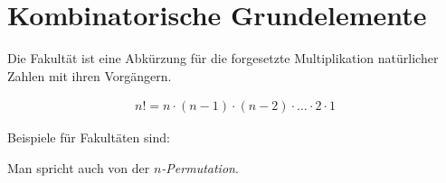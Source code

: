 \section{Kombinatorische Grundelemente}

\begin{defi}[Fakultät]
 Die Fakultät ist eine Abkürzung für die forgesetzte Multiplikation natürlicher Zahlen mit ihren Vorgängern.
 \begin{whitebox}
 \begin{align*}
  n! = n\cdot (n-1) \cdot (n-2) \cdot \ldots \cdot 2 \cdot 1
 \end{align*}
 \end{whitebox}
 
 Beispiele für Fakultäten sind:
 
\end{defi}

\begin{regel}[Anordnungsmöglichkeiten]
 Man spricht auch von der \emph{\(n\)-Permutation}.
\end{regel}

\begin{regel}
 
\end{regel}



